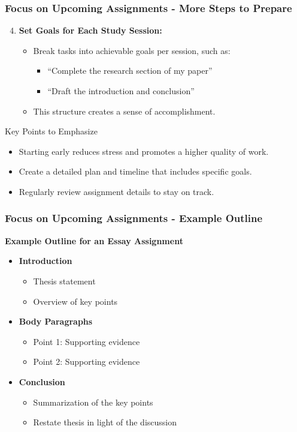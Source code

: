 \documentclass[aspectratio=169]{beamer}
\begin{document}
\begin{frame}[fragile]
    \frametitle{Focus on Upcoming Assignments - More Steps to Prepare}
    \begin{enumerate}
        \setcounter{enumi}{3}
        \item \textbf{Set Goals for Each Study Session:}
            \begin{itemize}
                \item Break tasks into achievable goals per session, such as:
                \begin{itemize}
                    \item “Complete the research section of my paper”
                    \item “Draft the introduction and conclusion”
                \end{itemize}
                \item This structure creates a sense of accomplishment.
            \end{itemize}
    \end{enumerate}
    \begin{block}{Key Points to Emphasize}
        \begin{itemize}
            \item Starting early reduces stress and promotes a higher quality of work.
            \item Create a detailed plan and timeline that includes specific goals.
            \item Regularly review assignment details to stay on track.
        \end{itemize}
    \end{block}
\end{frame}

\begin{frame}[fragile]
    \frametitle{Focus on Upcoming Assignments - Example Outline}
    \textbf{Example Outline for an Essay Assignment}
    \begin{itemize}
        \item \textbf{Introduction}
            \begin{itemize}
                \item Thesis statement
                \item Overview of key points
            \end{itemize}
        \item \textbf{Body Paragraphs}
            \begin{itemize}
                \item Point 1: Supporting evidence
                \item Point 2: Supporting evidence
            \end{itemize}
        \item \textbf{Conclusion}
            \begin{itemize}
                \item Summarization of the key points
                \item Restate thesis in light of the discussion
            \end{itemize}
    \end{itemize}
\end{frame}
\end{document}
